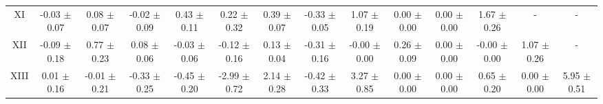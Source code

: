 \begin{table}[H]
{\begin{tabular}{cccccccccccccc}
    XI & -0.03 $\pm$ 0.07 & 0.08 $\pm$ 0.07 & -0.02 $\pm$ 0.09 & 0.43 $\pm$ 0.11 & 0.22 $\pm$ 0.32 & 0.39 $\pm$ 0.07 & -0.33 $\pm$ 0.05 & 1.07 $\pm$ 0.19 & 0.00 $\pm$ 0.00 & 0.00 $\pm$ 0.00 & 1.67 $\pm$ 0.26 & - & -\\
    XII & -0.09 $\pm$ 0.18 & 0.77 $\pm$ 0.23 & 0.08 $\pm$ 0.06 & -0.03 $\pm$ 0.06 & -0.12 $\pm$ 0.16 & 0.13 $\pm$ 0.04 & -0.31 $\pm$ 0.16 & -0.00 $\pm$ 0.00 & 0.26 $\pm$ 0.09 & 0.00 $\pm$ 0.00 & -0.00 $\pm$ 0.00 & 1.07 $\pm$ 0.26 & -\\
    XIII & 0.01 $\pm$ 0.16 & -0.01 $\pm$ 0.21 & -0.33 $\pm$ 0.25 & -0.45 $\pm$ 0.20 & -2.99 $\pm$ 0.72 & 2.14 $\pm$ 0.28 & -0.42 $\pm$ 0.33 & 3.27 $\pm$ 0.85 & 0.00 $\pm$ 0.00 & 0.00 $\pm$ 0.00 & 0.65 $\pm$ 0.20 & 0.00 $\pm$ 0.00 & 5.95 $\pm$ 0.51\\
    \hline\hline
    \end{tabular}}
\end{table}

